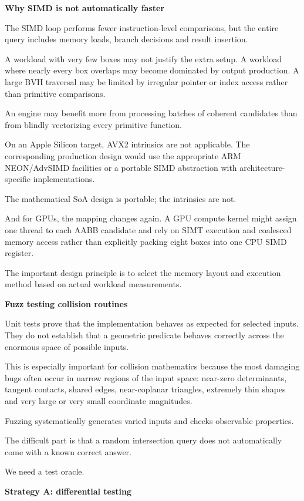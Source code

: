 \textbf{Why SIMD is not automatically faster}

The SIMD loop performs fewer instruction-level comparisons, but the entire query includes memory loads, branch decisions and result insertion.

A workload with very few boxes may not justify the extra setup. A workload where nearly every box overlaps may become dominated by output production. A large BVH traversal may be limited by irregular pointer or index access rather than primitive comparisons.

An engine may benefit more from processing batches of coherent candidates than from blindly vectorizing every primitive function.

On an Apple Silicon target, AVX2 intrinsics are not applicable. The corresponding production design would use the appropriate ARM NEON/AdvSIMD facilities or a portable SIMD abstraction with architecture-specific implementations.

The mathematical SoA design is portable; the intrinsics are not.

And for GPUs, the mapping changes again. A GPU compute kernel might assign one thread to each AABB candidate and rely on SIMT execution and coalesced memory access rather than explicitly packing eight boxes into one CPU SIMD register.

The important design principle is to select the memory layout and execution method based on actual workload measurements.

\textbf{Fuzz testing collision routines}

Unit tests prove that the implementation behaves as expected for selected inputs. They do not establish that a geometric predicate behaves correctly across the enormous space of possible inputs.

This is especially important for collision mathematics because the most damaging bugs often occur in narrow regions of the input space: near-zero determinants, tangent contacts, shared edges, near-coplanar triangles, extremely thin shapes and very large or very small coordinate magnitudes.

Fuzzing systematically generates varied inputs and checks observable properties.

The difficult part is that a random intersection query does not automatically come with a known correct answer.

We need a test oracle.

\textbf{Strategy A: differential testing}

